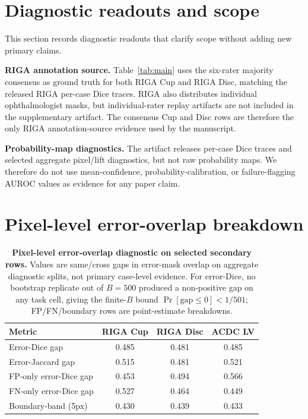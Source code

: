 \section{Diagnostic readouts and scope}
\label{sec:confidence-app}

This section records diagnostic readouts that clarify scope without adding new
primary claims.

\textbf{RIGA annotation source.} Table~\ref{tab:main} uses the six-rater
majority consensus as ground truth for both RIGA Cup and RIGA Disc, matching the
released RIGA per-case Dice traces. RIGA also distributes individual
ophthalmologist masks, but individual-rater replay artifacts are not included in
the supplementary artifact. The consensus Cup and Disc rows are therefore the only RIGA
annotation-source evidence used by the manuscript.

\textbf{Probability-map diagnostics.} The artifact releases per-case Dice traces
and selected aggregate pixel/lift diagnostics, but not raw probability maps. We
therefore do not use mean-confidence, probability-calibration, or
failure-flagging AUROC values as evidence for any paper claim.

\section{Pixel-level error-overlap breakdown}
\label{sec:pixerror-app}

\begin{table}[!htbp]
  \caption{\textbf{Pixel-level error-overlap diagnostic on selected secondary rows.} Values are same/cross gaps in error-mask overlap on aggregate diagnostic splits, not primary case-level evidence. For error-Dice, no bootstrap replicate out of $B{=}500$ produced a non-positive gap on any task cell, giving the finite-$B$ bound $\Pr[\mathrm{gap}{\leq}0]<1/501$; FP/FN/boundary rows are point-estimate breakdowns.}
  \label{tab:pixel-error-overlap}
  \centering\footnotesize
  \setlength{\tabcolsep}{3pt}
  \begin{tabularx}{\linewidth}{Yccc}
    \toprule
    Metric & RIGA Cup & RIGA Disc & ACDC LV \\
    \midrule
    Error-Dice gap           & 0.485 & 0.481 & 0.485 \\
    Error-Jaccard gap        & 0.515 & 0.481 & 0.521 \\
    FP-only error-Dice gap   & 0.453 & 0.494 & 0.566 \\
    FN-only error-Dice gap   & 0.527 & 0.464 & 0.449 \\
    Boundary-band (5px)      & 0.430 & 0.439 & 0.433 \\
    \bottomrule
  \end{tabularx}
\end{table}

